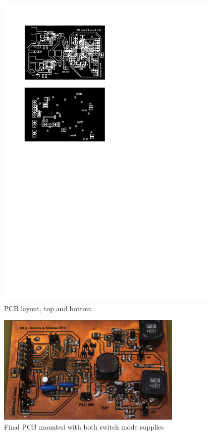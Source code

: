 \begin{figure}[H]
	\begin{centering}
		 \includegraphics[page=1,angle=90]{images/jens_print_4}
		\caption{PCB layout, top and bottom}
	\end{centering}
\end{figure}

\begin{figure}[H]
	\begin{centering}
		 \includegraphics[width=0.8\textwidth]{images/final_board.jpg}
		\caption{Final PCB mounted with both switch mode supplies}
	\end{centering}
\end{figure}
